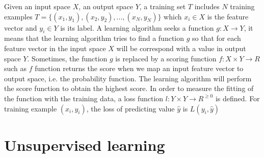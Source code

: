 Given an input space $X$, an output space $Y$, a training set $T$ includes $N$ training examples $T = \{(x_1,y_1), (x_2, y_2), ..., (x_N, y_N)\}$ which $x_i \in X$ is the feature vector and $y_i \in Y$ is its label. A learning algorithm seeks a function $g: X \rightarrow Y$, it means that the learning algorithm tries to find a function $g$ so that for each feature vector in the input space $X$ will be correspond with a value in output space $Y$. Sometimes, the function $g$ is replaced by a scoring function $f: X \times Y \rightarrow R$ such as $f$ function returns the score when we map an input feature vector to output space, i.e. the probability function. The learning algorithm will perform the score function to obtain the highest score. In order to measure the fitting of the function with the training data, a loss function $l: Y \times Y \rightarrow R^{\geq 0}$ is defined. For training example $(x_i,y_i)$, the loss of predicting value $\hat{y}$ is $L(y_i,\hat{y})$
\section{Unsupervised learning}


